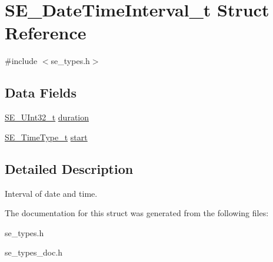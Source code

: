 \hypertarget{structSE__DateTimeInterval__t}{}\section{S\+E\+\_\+\+Date\+Time\+Interval\+\_\+t Struct Reference}
\label{structSE__DateTimeInterval__t}


{\ttfamily \#include $<$se\+\_\+types.\+h$>$}

\subsection*{Data Fields}
\begin{DoxyCompactItemize}
\item 
\hyperlink{group__UInt32_ga70bd4ecda3c0c85d20779d685a270cdb}{S\+E\+\_\+\+U\+Int32\+\_\+t} \hyperlink{group__DateTimeInterval_ga9b65adb6654c23c32b85094c22950f1e}{duration}
\item 
\hyperlink{group__TimeType_ga6fba87a5b57829b4ff3f0e7638156682}{S\+E\+\_\+\+Time\+Type\+\_\+t} \hyperlink{group__DateTimeInterval_gae3e78948c4059126d70ce13ffe67106c}{start}
\end{DoxyCompactItemize}


\subsection{Detailed Description}
Interval of date and time. 

The documentation for this struct was generated from the following files\+:\begin{DoxyCompactItemize}
\item 
se\+\_\+types.\+h\item 
se\+\_\+types\+\_\+doc.\+h\end{DoxyCompactItemize}
